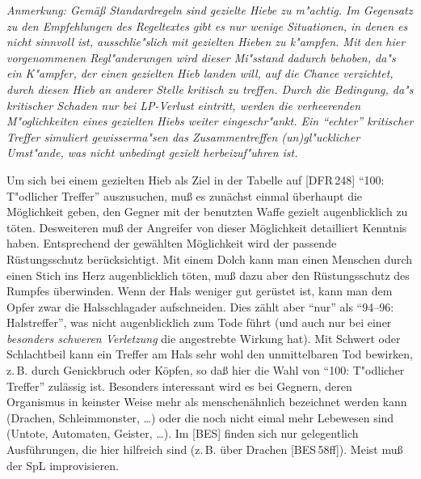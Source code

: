 \documentclass[10pt,a4paper,germanpar]{article}
\begin{document}
\emph{Anmerkung: Gemäß Standardregeln sind gezielte Hiebe zu
  m"achtig. Im Gegensatz zu den Empfehlungen des Regeltextes gibt es
  nur wenige Situationen, in denen es nicht sinnvoll ist,
  ausschlie"slich mit gezielten Hieben zu k"ampfen. Mit den hier
  vorgenommenen Regl"anderungen wird dieser Mi"sstand dadurch behoben,
  da"s ein K"ampfer, der einen gezielten Hieb landen will, auf die
  Chance verzichtet, durch diesen Hieb an anderer Stelle kritisch zu
  treffen. Durch die Bedingung, da"s kritischer Schaden nur bei
  LP-Verlust eintritt, werden die verheerenden M"oglichkeiten eines
  gezielten Hiebs weiter eingeschr"ankt. Ein "`echter"' kritischer
  Treffer simuliert gewisserma"sen das Zusammentreffen
  (un)gl"ucklicher Umst"ande, was nicht unbedingt gezielt
  herbeizuf"uhren ist.}

  
Um sich bei einem gezielten Hieb als Ziel in der Tabelle auf
[DFR\,248] "`100: T"odlicher Treffer"' auszusuchen, muß es zunächst
einmal überhaupt die Möglichkeit geben, den Gegner mit der benutzten
Waffe gezielt augenblicklich zu töten. Desweiteren muß der Angreifer
von dieser Möglichkeit detailliert Kenntnis haben. Entsprechend der
gewählten Möglichkeit wird der passende Rüstungsschutz
berücksichtigt. Mit einem Dolch kann man einen Menschen durch einen
Stich ins Herz augenblicklich töten, muß dazu aber den Rüstungsschutz
des Rumpfes überwinden. Wenn der Hals weniger gut gerüstet ist, kann
man dem Opfer zwar die Halsschlagader aufschneiden. Dies zählt aber
"`nur"' als "`94--96: Halstreffer"', was nicht augenblicklich zum Tode
führt (und auch nur bei einer \emph{besonders schweren Verletzung} die
angestrebte Wirkung hat). Mit Schwert oder Schlachtbeil kann ein
Treffer am Hals sehr wohl den unmittelbaren Tod bewirken, z.\,B. durch
Genickbruch oder Köpfen, so daß hier die Wahl von "`100: T"odlicher
Treffer"' zulässig ist. Besonders interessant wird es bei Gegnern,
deren Organismus in keinster Weise mehr als menschenähnlich bezeichnet
werden kann (Drachen, Schleimmonster, \dots) oder die noch nicht eimal
mehr Lebewesen sind (Untote, Automaten, Geister, \dots). Im [BES]
finden sich nur gelegentlich Ausführungen, die hier hilfreich sind
(z.\,B. über Drachen [BES\,58ff]). Meist muß der SpL improvisieren.
\end{document}
